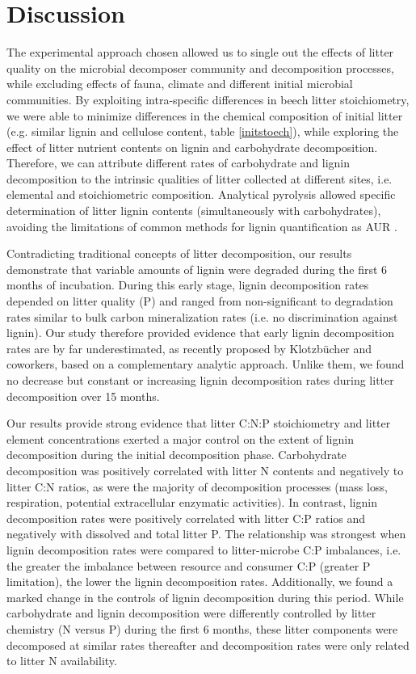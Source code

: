 \section*{Discussion}

The experimental approach chosen allowed us to single out the effects of litter quality on the microbial decomposer community and decomposition processes, while excluding effects of fauna, climate and different initial microbial communities. By exploiting intra-specific differences in beech litter stoichiometry, we were able to minimize differences in the chemical composition of initial litter (e.g. similar lignin and cellulose content, table \ref{initstoech}), while exploring the effect of litter nutrient contents on lignin and carbohydrate decomposition. Therefore, we can attribute different rates of carbohydrate and lignin decomposition to the intrinsic qualities of litter collected at different sites, i.e. elemental and stoichiometric composition. Analytical pyrolysis allowed specific determination of litter lignin contents (simultaneously with carbohydrates), avoiding the limitations of common methods for lignin quantification as AUR \cite{Hatfield2005}.

Contradicting traditional concepts of litter decomposition, our results demonstrate that variable amounts of lignin were degraded during the first 6 months of incubation. During this early stage, lignin decomposition rates depended on litter quality (P) and ranged from non-significant to degradation rates similar to bulk carbon mineralization rates (i.e. no discrimination against lignin). Our study therefore provided evidence that early lignin decomposition rates are by far underestimated, as recently proposed by Klotzb\"{u}cher and coworkers\cite{Klotzbucher2011}, based on a complementary analytic approach. Unlike them, we found no decrease but constant or increasing lignin decomposition rates during litter decomposition over 15 months.

Our results provide strong evidence that litter C:N:P stoichiometry and litter element concentrations exerted a major control on the extent of lignin decomposition during the initial decomposition phase. Carbohydrate decomposition was positively correlated with litter N contents and negatively to litter C:N ratios, as were the majority of decomposition processes (mass loss, respiration, potential extracellular enzymatic activities). In contrast, lignin decomposition rates were positively correlated with litter C:P ratios and negatively with dissolved and total litter P. The relationship was strongest when lignin decomposition rates were compared to litter-microbe C:P imbalances, i.e. the greater the imbalance between resource and consumer C:P (greater P limitation), the lower the lignin decomposition rates. Additionally, we found a marked change in the controls of lignin decomposition during this period. While carbohydrate and lignin decomposition were differently controlled by litter chemistry (N versus P) during the first 6 months, these litter components were decomposed at similar rates thereafter and decomposition rates were only related to litter N availability. 

